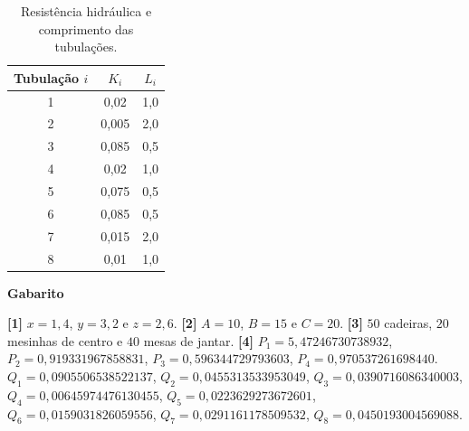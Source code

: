 \documentclass[12pt,a4paper]{article}
\begin{document}
\begin{enumerate}
\begin{table}[!htb]
 \centering
 \begin{tabular}{c|c|c}
  Tubulação $i$ & $K_i$ & $L_i$ \\ \hline
  1 & 0,02 & 1,0 \\ \hline
  2 & 0,005 & 2,0 \\ \hline
  3 & 0,085 & 0,5 \\ \hline
  4 & 0,02 & 1,0 \\ \hline
  5 & 0,075 & 0,5 \\ \hline
  6 & 0,085 & 0,5 \\ \hline
  7 & 0,015 & 2,0 \\ \hline
  8 & 0,01 & 1,0 
 \end{tabular}
 \caption{Resistência hidráulica e comprimento das tubulações.}
 \label{tab:dados}
\end{table}
 
\end{enumerate}

\begin{center}
\textbf{Gabarito}
\end{center} 
\textbf{[1]} $x = 1,4$, $y = 3,2$ e $z = 2,6$.
\textbf{[2]} $A=10$, $B=15$ e $C=20$. 
\textbf{[3]} $50$ cadeiras, $20$ mesinhas de centro e $40$ mesas de jantar. 
\textbf{[4]} $P_1 = 5,47246730738932$, $P_2 = 0,919331967858831$, $P_3 = 0,596344729793603$, $P_4 = 0,970537261698440$. 
$Q_1 = 0,0905506538522137$, $Q_2 = 0,0455313533953049$, $Q_3 = 0,0390716086340003$, $Q_4 = 0,00645974476130455$, 
$Q_5 = 0,0223629273672601$, \\ $Q_6 = 0,0159031826059556$, $Q_7 = 0,0291161178509532$, $Q_8 = 0,0450193004569088$.
\end{document}
